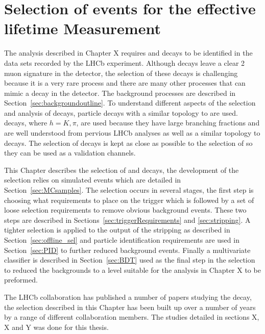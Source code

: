 \chapter{Selection of \bsmumu events for the effective lifetime Measurement}
\label{selection_chapter}
The analysis described in Chapter X requires \bsmumu and \bhh decays to be identified in the data sets recorded by the LHCb experiment. Although \bsmumu decays leave a clear 2 muon signature in the detector, the selection of these decays is challenging because it is a very rare process and there are many other processes that can mimic a \BsMuMu decay in the detector. The background processes are described in Section~\ref{sec:backgroundoutline}. To understand different aspects of the selection and analysis of \BsMuMu decays, particle decays with a similar topology to \BsMuMu are used. \bhh decays, where $h = K, \pi$, are used because they have large branching fractions and are well understood from pervious LHCb analyses as well as a similar topology to \bsmumu decays. The selection of \bhh decays is kept as close as possible to the selection of \bsmumu so they can be used as a validation channels.

This Chapter describes the selection of \bsmumu and \bhh decays, the development of the selection relies on simulated events which are detailed in Section~\ref{sec:MCsamples}. The selection occurs in several stages, the first step is choosing what requirements to place on the trigger which is followed by a set of loose selection requirements to remove obvious background events. These two steps are described in Sections~\ref{sec:triggerRequirements} and \ref{sec:stripping}. A tighter selection is applied to the output of the stripping as described in Section~\ref{sec:offline_sel} and particle identification requirements are used in Section~\ref{sec:PID} to further reduced background events. Finally a multivariate classifier is described in Section~\ref{sec:BDT} used as the final step in the selection to reduced the backgrounds to a level suitable for the analysis in Chapter X to be preformed. 


The LHCb collaboration has published a number of papers studying the \bsmumu decay, the selection described in this Chapter has been built up over a number of years by a range of different collaboration members. The studies detailed in sections X, X and Y was done for this thesis.





